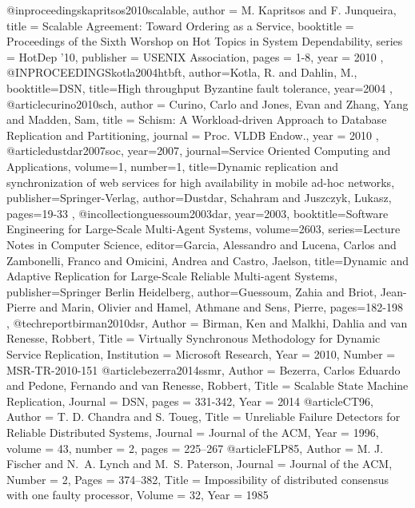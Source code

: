 @inproceedings{kapritsos2010scalable,
   author    = {M. Kapritsos and F. Junqueira},
   title     = {Scalable Agreement: Toward Ordering as a Service},
   booktitle = {Proceedings of the Sixth Worshop on Hot Topics in System Dependability},
   series    = {HotDep '10},
   publisher = {{USENIX} Association},
   pages     = {1-8},
   year      = {2010}
},
@INPROCEEDINGS{kotla2004htbft, 
author={Kotla, R. and Dahlin, M.}, 
booktitle={DSN}, 
title={High throughput Byzantine fault tolerance}, 
year={2004}
},
@article{curino2010sch,
 author = {Curino, Carlo and Jones, Evan and Zhang, Yang and Madden, Sam},
 title = {Schism: A Workload-driven Approach to Database Replication and Partitioning},
 journal = {Proc. VLDB Endow.},
 year = {2010}
},
@article{dustdar2007soc,
year={2007},
journal={Service Oriented Computing and Applications},
volume={1},
number={1},
title={Dynamic replication and synchronization of web services for high availability in mobile ad-hoc networks},
publisher={Springer-Verlag},
author={Dustdar, Schahram and Juszczyk, Lukasz},
pages={19-33}
},
@incollection{guessoum2003dar,
year={2003},
booktitle={Software Engineering for Large-Scale Multi-Agent Systems},
volume={2603},
series={Lecture Notes in Computer Science},
editor={Garcia, Alessandro and Lucena, Carlos and Zambonelli, Franco and Omicini, Andrea and Castro, Jaelson},
title={Dynamic and Adaptive Replication for Large-Scale Reliable Multi-agent Systems},
publisher={Springer Berlin Heidelberg},
author={Guessoum, Zahia and Briot, Jean-Pierre and Marin, Olivier and Hamel, Athmane and Sens, Pierre},
pages={182-198}
},
@techreport{birman2010dsr,
Author      = {Birman, Ken and Malkhi, Dahlia and van Renesse, Robbert},
Title       = {Virtually Synchronous Methodology for Dynamic Service Replication},
Institution = {Microsoft Research},
Year        = {2010},
Number      = {MSR-TR-2010-151}
}
@article{bezerra2014ssmr,
Author    = {Bezerra, Carlos Eduardo and Pedone, Fernando and van Renesse, Robbert},
Title     = {Scalable State Machine Replication},
Journal   = {DSN},
pages     = {331-342},
Year      = {2014}
}
@article{CT96,
Author    = {T. D. Chandra and S. Toueg},
Title     = {Unreliable Failure Detectors for Reliable Distributed Systems},
Journal   = {Journal of the ACM},
Year      = {1996},
volume    = {43},
number    = {2},
pages     = {225--267}
}
@article{FLP85,
Author    = {M. J. Fischer and N.~A. Lynch and M.~S. Paterson},
Journal   = {Journal of the ACM},
Number    = {2},
Pages     = {374--382},
Title     = {Impossibility of distributed consensus with one faulty processor},
Volume    = {32},
Year      = {1985}
}
